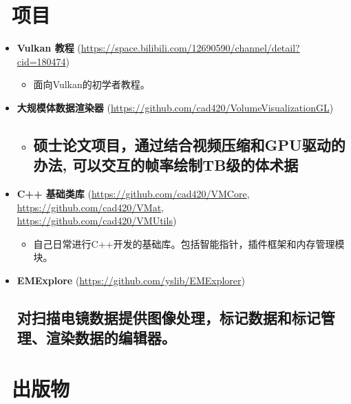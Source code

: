 \documentclass{resume}
\begin{document}
\section{\faUsers\ 项目}

\begin{itemize}

\item \textbf{Vulkan 教程} (\url{https://space.bilibili.com/12690590/channel/detail?cid=180474})

\begin{itemize}
  \item 面向Vulkan的初学者教程。
\end{itemize}


\item \textbf{大规模体数据渲染器} (\url{https://github.com/cad420/VolumeVisualizationGL})

\begin{itemize}
  \item
  \subsection{硕士论文项目，通过结合视频压缩和GPU驱动的办法, 可以交互的帧率绘制TB级的体术据}
\end{itemize}


\item \textbf{C++ 基础类库} (\url{https://github.com/cad420/VMCore}, \url{https://github.com/cad420/VMat},\\
 \url{https://github.com/cad420/VMUtils})

\begin{itemize}

\item 自己日常进行C++开发的基础库。包括智能指针，插件框架和内存管理模块。
\end{itemize}

\item \textbf{EMExplore} (\url{https://github.com/yslib/EMExplorer})

\subsection{
  对扫描电镜数据提供图像处理，标记数据和标记管理、渲染数据的编辑器。
}

\end{itemize}

\section{\faUsers\ 出版物}
\end{document}
